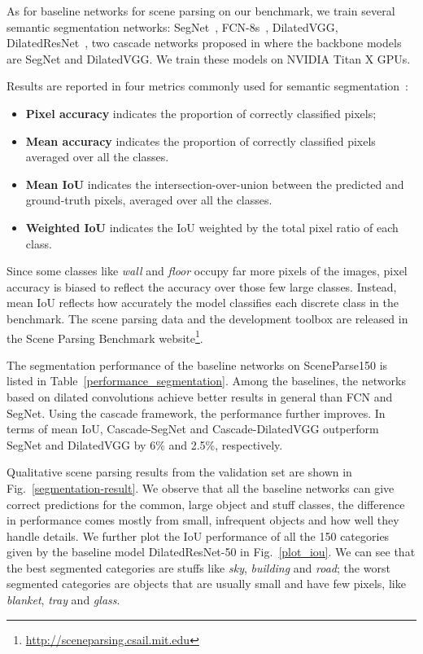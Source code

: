 As for baseline networks for scene parsing on our benchmark, we train several semantic segmentation networks: SegNet~\citep{badrinarayanan2015segnet}, FCN-8s~\citep{long2015fully}, DilatedVGG, DilatedResNet~\citep{CP2016Deeplab, YuKoltun2016}, two cascade networks proposed in \cite{zhou2017scene} where the backbone models are SegNet and DilatedVGG. We train these models on NVIDIA Titan X GPUs. 

Results are reported in four metrics commonly used for semantic segmentation~\citep{long2015fully}:

\begin{itemize}
\item \textbf{Pixel accuracy} indicates the proportion of correctly classified pixels;
\item \textbf{Mean accuracy} indicates the proportion of correctly classified pixels averaged over all the classes. 
\item \textbf{Mean IoU} indicates the intersection-over-union between the predicted and ground-truth pixels, averaged over all the classes. 
\item \textbf{Weighted IoU} indicates the IoU weighted by the total pixel ratio of each class.
\end{itemize}

Since some classes like \textit{wall} and \textit{floor} occupy far more pixels of the images, pixel accuracy is biased to reflect the accuracy over those few large classes. Instead, mean IoU reflects how accurately the model classifies each discrete class in the benchmark. The scene parsing data and the development toolbox are released in the Scene Parsing Benchmark website\footnote{\url{http://sceneparsing.csail.mit.edu}}. 

The segmentation performance of the baseline networks on SceneParse150 is listed in Table~\ref{performance_segmentation}. Among the baselines, the networks based on dilated convolutions achieve better results in general than FCN and SegNet. Using the cascade framework, the performance further improves. In terms of mean IoU, Cascade-SegNet and Cascade-DilatedVGG outperform SegNet and DilatedVGG by 6\% and 2.5\%, respectively.

Qualitative scene parsing results from the validation set are shown in Fig.~\ref{segmentation-result}. We observe that all the baseline networks can give correct predictions for the common, large object and stuff classes, the difference in performance comes mostly from small, infrequent objects and how well they handle details. We further plot the IoU performance of all the 150 categories given by the baseline model DilatedResNet-50 in Fig.~\ref{plot_iou}. We can see that the best segmented categories are stuffs like \textit{sky}, \textit{building} and \textit{road}; the worst segmented categories are objects that are usually small and have few pixels, like \textit{blanket}, \textit{tray} and \textit{glass}.

